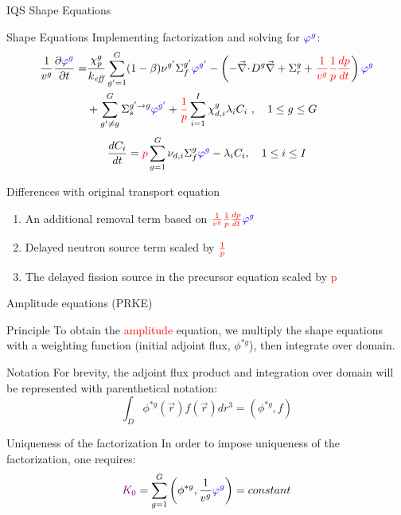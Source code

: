 \documentclass[8pt,xcolor=dvipnames]{beamer}
\renewcommand{\div}{\vec{\nabla}\! \cdot \!}
\newcommand{\grad}{\vec{\nabla}}
\newcommand{\ben}{\begin{enumerate}}
\newcommand{\een}{\end{enumerate}}
\newcommand{\keff}{\ensuremath{k_{\textit{eff}}}}
\newcommand{\tcr}[1]{\textcolor{red}{#1}}
\newcommand{\tcb}[1]{\textcolor{blue}{#1}}
\newcommand{\tcp}[1]{\textcolor{violet}{#1}}
\begin{document}
\begin{frame}{IQS Shape Equations}

\begin{block}{Shape Equations}
Implementing factorization and solving for $\tcb{\varphi^g}$:
\begin{align*}
\frac{1}{v^g} \frac{\partial \tcb{\varphi^g} }{\partial t} =& \frac{\chi_p^g}{\keff} \sum_{g'=1}^G (1-\beta) \nu^{g'} \Sigma_f^{g'} \tcb{\varphi^{g'}} -  \left( -\div D^g \grad  + \Sigma_r^g + \tcr{\frac{1}{v^g}}\tcr{\frac{1}{p}}\tcr{\frac{dp}{dt}}\right) \tcb{\varphi^g}  \nonumber \\
&  + \sum_{g'\neq g}^G\Sigma_s^{g'\to g} \tcb{\varphi^{g'}}  + \tcr{\frac{1}{p}}\sum_{i=1}^I\chi_{d,i}^g\lambda_i C_i \ , \quad 1 \le g \le G 
\end{align*}
\begin{equation*}
\frac{dC_i}{dt} = \tcr{p}\sum_{g=1}^G \nu_{d,i} \Sigma_f^g \tcb{\varphi^{g}} - \lambda_iC_i , \quad 1 \le i \le I
\end{equation*}
\end{block}

\begin{block}{Differences with original transport equation}
\ben
\item An additional removal term based on $\tcr{\frac{1}{v^g}\frac{1}{p}\frac{dp}{dt}} \tcb{\varphi^g}$
\item Delayed neutron source term scaled by $\tcr{\frac{1}{p}}$
\item The delayed fission source in the precursor equation scaled by \tcr{p}
\een
\end{block}

\end{frame}


\begin{frame}{Amplitude equations (PRKE)}

\begin{block}{Principle}
To obtain the \tcr{amplitude} equation, we multiply the shape equations with a weighting 
function (initial adjoint flux, $\phi^{*g}$), then integrate over domain.  
\end{block}

\begin{block}{Notation}
For brevity, the adjoint flux product and integration over domain will be represented with parenthetical notation:
\[
\int_D\phi^{*g}(\vec{r})f(\vec{r})dr^3=\left(\phi^{*g},f\right)
\]
\end{block}


\begin{block}{Uniqueness of the factorization}
In order to impose uniqueness of the factorization, one requires:
\[
\tcp{K_0} = \sum_{g=1}^G\left(\phi^{*g},\frac{1}{v^g}\tcb{\varphi^g}\right)= constant
\]
\end{block}


\end{frame}
\end{document}
